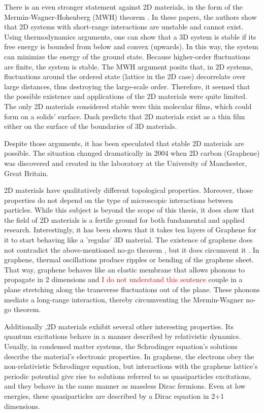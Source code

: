 There is an even stronger statement against 2D materials, in the form of the Mermin-Wagner-Hohenberg (MWH) theorem \cite{Hohenberg}\cite{Mermin2}. In these papers, the authors show that 2D systems with short-range interactions are unstable and cannot exist.  Using thermodynamics arguments, one can show that a 3D system is stable if its free energy is bounded from below and convex (upwards). In this way, the system can minimize the energy of the ground state. Because higher-order fluctuations are finite, the system is stable.
The MWH argument posits that, in 2D systems, fluctuations around the ordered state (lattice in the 2D case) decorrelate over large distances, thus destroying the large-scale order. 
Therefore, it seemed that the possible existence and applications of the 2D materials were quite limited. The only 2D materials considered stable were thin molecular films, which could form on a solids' surface. Dash\cite{2DMatter1} predicts that 2D materials exist as a thin film either on the surface of the boundaries of 3D materials.

Despite those arguments, it has been speculated that stable 2D materials are possible\cite{2DMatter1}. The situation changed dramatically in 2004 when 2D carbon (Graphene) was discovered and created in the laboratory\cite{Graphene0, GrapheneN} at the University of Manchester, Great Britain. 

2D materials have qualitatively different topological properties\cite{2DMatterCurvature}. Moreover, those properties do not depend on the type of microscopic interactions between particles. While this subject is beyond the scope of this thesis, it does show that the field of 2D materials is a fertile ground for both fundamental and applied research. Interestingly, it has been shown \cite{GraphLayers} that it takes ten layers of Graphene for it to start behaving like a 'regular' 3D material.  
The existence of graphene does not contradict the above-mentioned no-go theorem \cite{Mermin2}, but it does circumvent it \cite{GrapheneRiples}. In graphene, thermal oscillations produce ripples or bending of the graphene sheet. That way, graphene behaves like an elastic membrane that allows phonons to propagate in 2 dimensions and \textcolor{red}{I do not understand this sentence} couple in a plane stretching along the transverse fluctuations out of the plane. These phonons mediate a long-range interaction, thereby circumventing the Mermin-Wagner no-go theorem. 

Additionally \cite{Graphene0},2D materials exhibit several other interesting properties. Its quantum excitations behave in a manner described by relativistic dynamics. Usually, in condensed matter systems, the Schrodinger equation's solutions describe the material's electronic properties. In graphene, the electrons obey the non-relativistic Schrodinger equation, but interactions with the graphene lattice's periodic potential give rise to solutions referred to as quasiparticles excitations, and they behave in the same manner as massless Dirac fermions. Even at low energies, these quasiparticles are described by a Dirac equation in 2+1 dimensions.  

